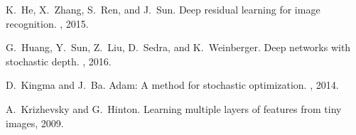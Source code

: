 \documentclass{sig-alternate}
\begin{document}
%
\begin{thebibliography}{1}

K.~He, X.~Zhang, S.~Ren, and J.~Sun.
\newblock Deep residual learning for image recognition.
, 2015.

G.~Huang, Y.~Sun, Z.~Liu, D.~Sedra, and K.~Weinberger.
\newblock Deep networks with stochastic depth.
, 2016.

D.~Kingma and J.~Ba.
\newblock Adam: A method for stochastic optimization.
, 2014.

A.~Krizhevsky and G.~Hinton.
\newblock Learning multiple layers of features from tiny images, 2009.

\end{thebibliography}
%
%

\end{document}
